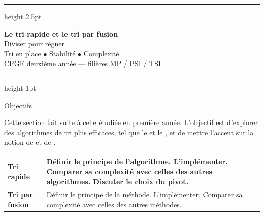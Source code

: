 \documentclass[11pt,aspectratio=169]{beamer}
\begin{document}
\begin{frame}[plain]
  \vfill
  \begin{center}
    {\color{teal}\hrule height 2.5pt}\vspace{12pt}
    {\Huge\bfseries\color{teal} Le tri rapide et le tri par fusion}\\[12pt]
    {\large Diviser pour régner}\\[6pt]
    {\normalsize Tri en place \;$\bullet$\; Stabilité \;$\bullet$\; Complexité}\\[14pt]
    {\normalsize CPGE deuxième année --- filières MP / PSI / TSI}\\[10pt]
    {\color{teal}\hrule height 1pt}
  \end{center}
  \vfill
\end{frame}

\begin{frame}{Objectifs}
\begin{encadre}
\small
Cette section fait suite à celle étudiée en première année. L'objectif est d'explorer
des algorithmes de tri plus efficaces, tel que le  et le
, et de mettre l'accent sur la notion de
 et de .
\end{encadre}
\vspace{8pt}
\begin{center}\small
\begin{tabular}{p{3cm}p{8cm}}
\toprule
\textbf{Tri rapide} & Définir le principe de l'algorithme. L'implémenter.
Comparer sa complexité avec celles des autres algorithmes. Discuter le choix du pivot.\\
\midrule
\textbf{Tri par fusion} & Définir le principe de la méthode. L'implémenter.
Comparer sa complexité avec celles des autres méthodes.\\
\bottomrule
\end{tabular}
\end{center}
\end{frame}
\end{document}
